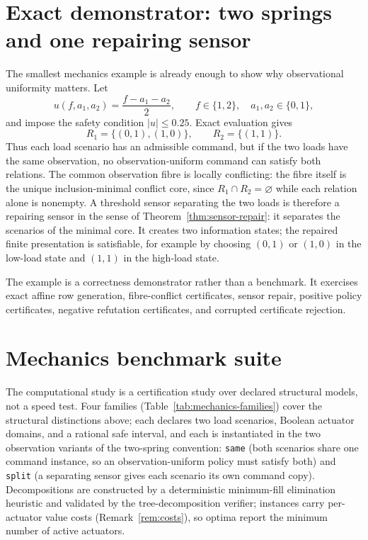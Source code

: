 \documentclass[11pt]{article}
\theoremstyle{plain}
\theoremstyle{definition}
\theoremstyle{remark}
\begin{document}
\section{Exact demonstrator: two springs and one repairing sensor}
\label{sec:two-spring}

The smallest mechanics example is already enough to show why observational
uniformity matters.  Let
\[
  u(f,a_1,a_2)=\frac{f-a_1-a_2}{2},\qquad
  f\in\{1,2\},\quad a_1,a_2\in\{0,1\},
\]
and impose the safety condition \(|u|\le 0.25\).  Exact evaluation gives
\[
  R_1=\{(0,1),(1,0)\},
  \qquad
  R_2=\{(1,1)\}.
\]
Thus each load scenario has an admissible command, but if the two loads have the
same observation, no observation-uniform command can satisfy both relations.
The common observation fibre is locally conflicting: the fibre itself is the
unique inclusion-minimal conflict core, since \(R_1\cap R_2=\varnothing\)
while each relation alone is nonempty.  A threshold sensor separating the two
loads is therefore a repairing sensor in the sense of
Theorem~\ref{thm:sensor-repair}: it separates the scenarios of the minimal
core.  It creates two information states; the repaired finite
presentation is satisfiable, for example by choosing \((0,1)\) or \((1,0)\) in
the low-load state and \((1,1)\) in the high-load state.

The example is a correctness demonstrator rather than a benchmark.  It exercises
exact affine row generation, fibre-conflict certificates, sensor repair,
positive policy certificates, negative refutation certificates, and corrupted
certificate rejection.

\section{Mechanics benchmark suite}
\label{sec:mechanics-benchmarks}

The computational study is a certification study over declared structural
models, not a speed test.  Four families (Table~\ref{tab:mechanics-families})
cover the structural distinctions
above; each declares two load scenarios, Boolean actuator domains, and a
rational safe interval, and each is instantiated in the two observation
variants of the two-spring convention: \texttt{same} (both scenarios share
one command instance, so an observation-uniform policy must satisfy both) and
\texttt{split} (a separating sensor gives each scenario its own command
copy).  Decompositions are constructed by a deterministic minimum-fill
elimination heuristic and validated by the tree-decomposition verifier;
instances carry per-actuator value costs (Remark~\ref{rem:costs}), so optima
report the minimum number of active actuators.
\end{document}
